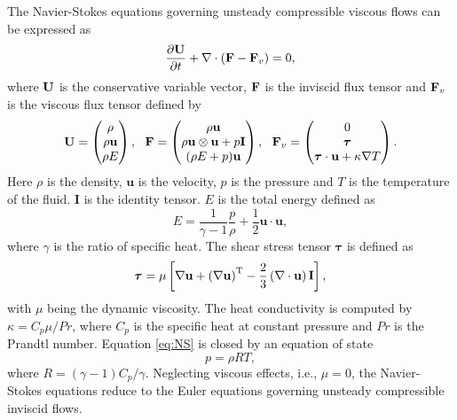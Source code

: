 The Navier-Stokes equations governing unsteady compressible viscous flows can be expressed as
\begin{equation}
    \label{eq:NS}
    \dfrac{\partial \mathbf{U}}{\partial t} +
    \nabla \cdot (\mathbf{F} - \mathbf{F}_v)= 0,
\end{equation}
where $\mathbf{U}$ is the conservative variable vector, $\mathbf{F}$ is the inviscid flux tensor and $\mathbf{F}_v$
is the viscous flux tensor defined by
\begin{equation}
    \mathbf{U} = \begin{pmatrix}
        \rho \\ \rho \mathbf{u} \\ \rho E
    \end{pmatrix},\ \
    \mathbf{F}= \begin{pmatrix}
        \rho \mathbf{u}                                \\
        \rho \mathbf{u}\otimes \mathbf{u}+p \mathbf{I} \\
        (\rho E+p)\mathbf{u}                           \\
    \end{pmatrix},\ \
    \mathbf{F}_{v} = \begin{pmatrix}
        0                                                    \\
        \boldsymbol{\tau}                                    \\
        \boldsymbol{\tau} \cdot \mathbf{u} + \kappa \nabla T \\
    \end{pmatrix}.
\end{equation}
Here $\rho$ is the density, $\mathbf{u}$ is the velocity, $p$ is the pressure and $T$ is the temperature of the fluid. $\mathbf{I}$ is the identity tensor. $E$ is the total energy defined as
\begin{equation}
    E = \dfrac{1}{\gamma-1} \dfrac{p}{\rho} + \frac{1}{2} \mathbf{u} \cdot \mathbf{u},
\end{equation}
where $\gamma$ is the ratio of specific heat. The shear stress tensor $\boldsymbol{\tau}$ is defined as
\begin{equation}
    \boldsymbol{\tau}= \mu \left[ \nabla \mathbf{u} + \left(\nabla \mathbf{u}\right)^\mathrm{T} - \frac{2}{3} \left(\nabla \cdot \mathbf{u}\right) \mathbf{I} \right],
\end{equation}
with $\mu$ being the dynamic viscosity. The heat conductivity is computed by $\kappa=C_p \mu /Pr$, where $C_p$ is the specific heat at constant pressure and $Pr$ is the Prandtl number. Equation \eqref{eq:NS} is closed by an equation of state
\begin{equation}
    p= \rho R T,
\end{equation}
where $R= \left(\gamma-1\right) C_p/\gamma$.
Neglecting viscous effects, i.e., $\mu=0$, the Navier-Stokes equations reduce to the Euler equations governing unsteady compressible inviscid flows.

